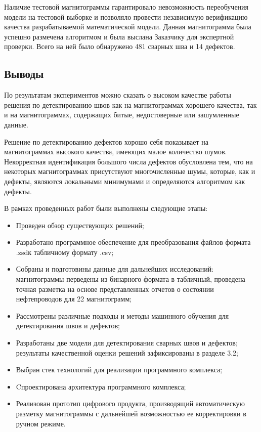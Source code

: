 \documentclass[a4paper,article,14pt]{extarticle}
\begin{document}
Наличие тестовой магнитограммы гарантировало невозможность переобучения модели на тестовой выборке 
и позволяло провести независимую верификацию качества разрабатываемой математической модели. 
Данная магнитограмма была успешно размечена алгоритмом и была выслана Заказчику для экспертной 
проверки. Всего на ней было обнаружено 481 сварных шва и 14 дефектов.

\subsection{Выводы}

По результатам экспериментов можно сказать о высоком качестве работы решения по детектированию швов 
как на магнитограммах хорошего качества, так и на магнитограммах, содержащих битые, недостоверные или 
зашумленные данные.

Решение по детектированию дефектов хорошо себя показывает на магнитограммах высокого качества, 
имеющих малое количество шумов.  Некорректная идентификация большого числа дефектов обусловлена 
тем, что на некоторых магнитограммах присутствуют многочисленные шумы, которые, как и дефекты, 
являются локальными минимумами и определяются алгоритмом как дефекты.

\pagebreak


В рамках проведенных работ были выполнены следующие этапы:

\begin{itemize}
    \item Проведен обзор существующих решений;
    \item Разработано программное обеспечение для преобразования файлов формата \flqq .zsd\frqq к табличному формату \flqq .csv\frqq;
    \item Собраны и подготовины данные для дальнейших исследований: магнитограммы перведены из бинарного формата в табличный, проведена точная разметка на основе представленных отчетов о состоянии нефтепроводов для 22 магнитограмм;
    \item Рассмотрены различные подходы и методы машинного обучения для детектирования швов и дефектов;
    \item Разработаны две модели для детектирования сварных швов и дефектов; результаты качественной оценки решений зафиксированы в разделе 3.2; 
    \item Выбран стек технологий для реализации программного комплекса;
    \item Cпроектирована архитектура программного комплекса;
    \item Реализован прототип цифрового продукта, производящий автоматическую разметку магнитограммы с дальнейшей возможностью ее корректировки в ручном режиме.

\end{itemize}
\end{document}
